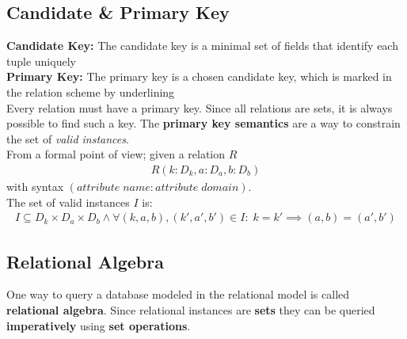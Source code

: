 \subsection{Candidate \& Primary Key}
\textbf{Candidate Key:} The candidate key is a minimal set of fields that identify each tuple uniquely\\
\textbf{Primary Key:} The primary key is a chosen candidate key, which is marked in the relation scheme by underlining \vspace{.2cm}\\
Every relation must have a primary key. Since all relations are sets, it is always possible to find such a key. The \textbf{primary key semantics} are a way to constrain the set of \textit{valid instances}. \\
From a formal point of view; given a relation $R$
\begin{align*}
R(k:D_k, a:D_a, b:D_b)
\end{align*}
with syntax $(attribute\;name : attribute\;domain)$.\\
The set of valid instances $I$ is:
\begin{align*}
I \subseteq D_k \times D_a \times D_b \land \forall(k,a,b), (k', a', b') \in I:\;k = k' \implies (a,b) = (a', b')
\end{align*}

\subsection{Relational Algebra}
One way to query a database modeled in the relational model is called \textbf{relational algebra}. Since relational instances are \textbf{sets} they can be queried \textbf{imperatively} using \textbf{set operations}.

